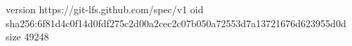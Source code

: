 version https://git-lfs.github.com/spec/v1
oid sha256:6f81d4c0f14d0fdf275c2d00a2cec2c07b050a72553d7a13721676d623955d0d
size 49248
